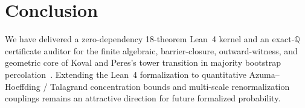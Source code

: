 \documentclass[11pt,twocolumn]{article}
\newcommand{\QQ}{\mathbb{Q}}
\begin{document}
\section{Conclusion}
We have delivered a zero-dependency 18-theorem Lean~4 kernel and an exact-$\QQ$ certificate auditor for the finite algebraic, barrier-closure, outward-witness, and geometric core of Koval and Peres's tower transition in majority bootstrap percolation~\cite{koval2026tower}. Extending the Lean~4 formalization to quantitative Azuma--Hoeffding / Talagrand concentration bounds and multi-scale renormalization couplings remains an attractive direction for future formalized probability.



\end{document}
